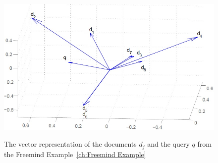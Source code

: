 \begin{figure}
  \centering
  \includegraphics[width=\linewidth]{src/pic/lsf-vectors}
  \label{pic:lsi_vectors}
  \caption{The vector representation of the documents $d_j$ and the query $q$ from the Freemind Example~\ref{ch:Freemind Example}}
\end{figure}

